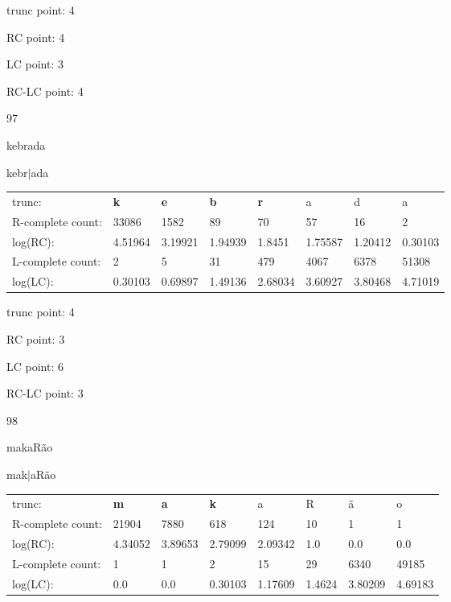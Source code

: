 \documentclass{article}
\begin{document}
trunc point: 4

RC point: 4

LC point: 3

RC-LC point: 4

\vspace{3em}



97

kebrada

kebr$|$ada

\vspace{1em}

\begin{tabular}{l|lllllll}

trunc: & {\color{red}\bf k} & {\color{red}\bf e} & {\color{red}\bf b} & {\color{red}\bf r} & a & d & a \\ 
R-complete count: & 33086 & 1582 & 89 & 70 & 57 & 16 & 2 \\ 
log(RC): & 4.51964 & 3.19921 & 1.94939 & 1.8451 & 1.75587 & 1.20412 & 0.30103 \\ 
L-complete count: & 2 & 5 & 31 & 479 & 4067 & 6378 & 51308 \\ 
log(LC): & 0.30103 & 0.69897 & 1.49136 & 2.68034 & 3.60927 & 3.80468 & 4.71019 \\ 
\end{tabular}

trunc point: 4

RC point: 3

LC point: 6

RC-LC point: 3

\vspace{3em}



98

makaRão

mak$|$aRão

\vspace{1em}

\begin{tabular}{l|lllllll}

trunc: & {\color{red}\bf m} & {\color{red}\bf a} & {\color{red}\bf k} & a & R & ã & o \\ 
R-complete count: & 21904 & 7880 & 618 & 124 & 10 & 1 & 1 \\ 
log(RC): & 4.34052 & 3.89653 & 2.79099 & 2.09342 & 1.0 & 0.0 & 0.0 \\ 
L-complete count: & 1 & 1 & 2 & 15 & 29 & 6340 & 49185 \\ 
log(LC): & 0.0 & 0.0 & 0.30103 & 1.17609 & 1.4624 & 3.80209 & 4.69183 \\ 
\end{tabular}
\end{document}
